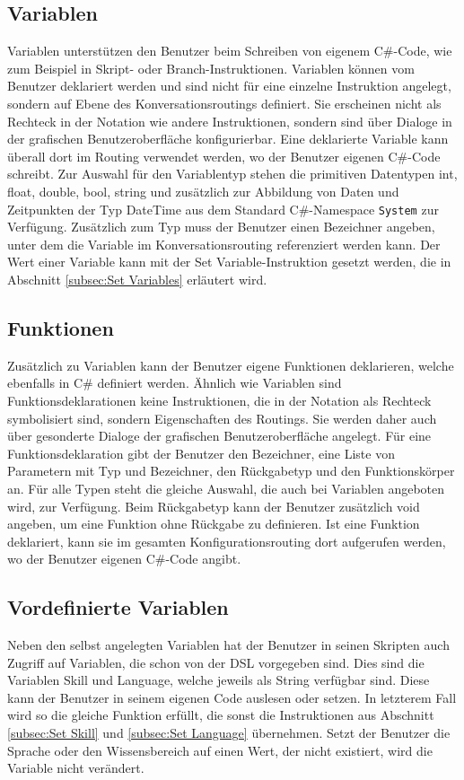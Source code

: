 \subsection{Variablen}
\label{subsec:Variablen}
Variablen unterstützen den Benutzer beim Schreiben von eigenem C\#-Code, wie zum Beispiel in Skript- oder Branch-Instruktionen. Variablen können vom Benutzer deklariert werden und sind nicht für eine einzelne Instruktion angelegt, sondern auf Ebene des Konversationsroutings definiert. Sie erscheinen nicht als Rechteck in der Notation wie andere Instruktionen, sondern sind über Dialoge in der grafischen Benutzeroberfläche konfigurierbar. Eine deklarierte Variable kann überall dort im Routing verwendet werden, wo der Benutzer eigenen C\#-Code schreibt. Zur Auswahl für den Variablentyp stehen die primitiven Datentypen int, float, double, bool, string und zusätzlich zur Abbildung von Daten und Zeitpunkten der Typ DateTime aus dem Standard C\#-Namespace \texttt{System} zur Verfügung. Zusätzlich zum Typ muss der Benutzer einen Bezeichner angeben, unter dem die Variable im Konversationsrouting referenziert werden kann. Der Wert einer Variable kann mit der Set Variable-Instruktion gesetzt werden, die in Abschnitt \ref{subsec:Set Variables} erläutert wird. 

\subsection{Funktionen}
Zusätzlich zu Variablen kann der Benutzer eigene Funktionen deklarieren, welche ebenfalls in C\# definiert werden. Ähnlich wie Variablen sind Funktionsdeklarationen keine Instruktionen, die in der Notation als Rechteck symbolisiert sind, sondern Eigenschaften des Routings. Sie werden daher auch über gesonderte Dialoge der grafischen Benutzeroberfläche angelegt. Für eine Funktionsdeklaration gibt der Benutzer den Bezeichner, eine Liste von Parametern mit Typ und Bezeichner, den Rückgabetyp und den Funktionskörper an. Für alle Typen steht die gleiche Auswahl, die auch bei Variablen angeboten wird, zur Verfügung. Beim Rückgabetyp kann der Benutzer zusätzlich void angeben, um eine Funktion ohne Rückgabe zu definieren. Ist eine Funktion deklariert, kann sie im gesamten Konfigurationsrouting dort aufgerufen werden, wo der Benutzer eigenen C\#-Code angibt.  

\subsection{Vordefinierte Variablen}
Neben den selbst angelegten Variablen hat der Benutzer in seinen Skripten auch Zugriff auf Variablen, die schon von der DSL vorgegeben sind. Dies sind die Variablen Skill und Language, welche jeweils als String verfügbar sind. Diese kann der Benutzer in seinem eigenen Code auslesen oder setzen. In letzterem Fall wird so die gleiche Funktion erfüllt, die sonst die Instruktionen aus Abschnitt \ref{subsec:Set Skill} und \ref{subsec:Set Language} übernehmen. Setzt der Benutzer die Sprache oder den Wissensbereich auf einen Wert, der nicht existiert, wird die Variable nicht verändert. 


